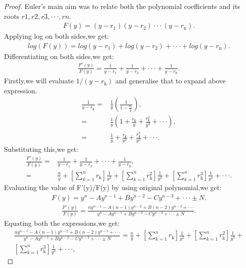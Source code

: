 \documentclass[a4paper,reqno,11pt]{book}
\theoremstyle{plain}%
\theoremstyle{definition}
\begin{document}
\begin{proof}
Euler's main aim was to relate both the polynomial coefficients and its roots $r1,r2,r3,\cdot\cdot\cdot,rn$.
\begin{eqnarray*}
F(y)=(y-r_{\text{1}})(y-r_{\text{2}})\cdot\cdot\cdot(y-r_{\text{n}}).
\end{eqnarray*}
Applying log on both sides,we get:
\begin{eqnarray*}
log(F(y))=log(y-r_{\text{1}})+log(y-r_{\text{2}})+\cdot\cdot\cdot+log(y-r_{\text{n}}).
\end{eqnarray*}
Differentiating on both sides,we get:
\begin{eqnarray*}
\frac{F'(y)}{F(y)}=\frac{1}{y-r_{\text{1}}}+\frac{1}{y-r_{\text{2}}}+\cdot\cdot\cdot+\frac{1}{y-r_{\text{n}}}.
\end{eqnarray*}
Firstly,we will evaluate $1/(y-r_{\text{k}})$ and generalise that to expand above expression.
\begin{align*}
    \frac{1}{y-r_{\text{k}}}=&\frac{1}{y}\left(\frac{1}{1-\frac{r_{\text{k}}}{y}}\right),\\
    =&\frac{1}{y}\left(1+\frac{r_{\text{k}}}{y}+\frac{r_{\text{k}}^2}{y^2}+\cdot\cdot\cdot\right),\\
    =&\frac{1}{y}+\frac{r_{\text{k}}}{y^2}+\frac{r_{\text{k}}^2}{y^3}+\cdot\cdot\cdot.
\end{align*}
Substituting this,we get:
\begin{align*}
    \frac{F'(y)}{F(y)}=&\frac{1}{y-r_{\text{1}}}+\frac{1}{y-r_{\text{2}}}+\cdot\cdot\cdot+\frac{1}{y-r_{\text{n}}},\\
    =&\frac{n}{y}+\left[\sum_{k=1}^{n}r_{\text{k}}\right]\frac{1}{y^2}+\left[\sum_{k=1}^{n}r_{\text{k}}^2\right]\frac{1}{y^3}+\left[\sum_{k=1}^{n}r_{\text{k}}^3\right]\frac{1}{y^4}+\cdot\cdot\cdot.
\end{align*}
Evaluating the value of F'(y)/F(y) by using original polynomial,we get:
\begin{eqnarray*}
    F(y)=y^n-Ay^{n-1}+By^{n-2}-Cy^{n-3}+\cdot\cdot\cdot \pm N.
\end{eqnarray*}
\begin{eqnarray*}
    \frac{F'(y)}{F(y)}=\frac{ny^{n-1}-A(n-1)y^{n-2}+B(n-2)y^{n-3}+\cdot\cdot\cdot}{y^n-Ay^{n-1}+By^{n-2}-Cy^{n-3}+\cdot\cdot\cdot \pm N}.
\end{eqnarray*}
Equating both the expressions,we get:
\begin{eqnarray*}
    \frac{ny^{n-1}-A(n-1)y^{n-2}+B(n-2)y^{n-3}+\cdot\cdot\cdot}{y^n-Ay^{n-1}+By^{n-2}-Cy^{n-3}+\cdot\cdot\cdot \pm N}=\frac{n}{y}+\left[\sum_{k=1}^{n}r_{\text{k}}\right]\frac{1}{y^2}+\left[\sum_{k=1}^{n}r_{\text{k}}^2\right]\frac{1}{y^3}+\\\left[\sum_{k=1}^{n}r_{\text{k}}^3\right]\frac{1}{y^4}+\cdot\cdot\cdot,

\end{eqnarray*}
\end{proof}
\end{document}
